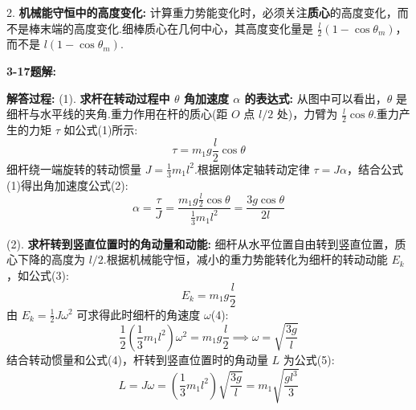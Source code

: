 2. \textbf{机械能守恒中的高度变化:} 计算重力势能变化时，必须关注\textbf{质心}的高度变化，而不是棒末端的高度变化.细棒质心在几何中心，其高度变化量是 $\frac{l}{2}(1-\cos\theta_m)$，而不是 $l(1-\cos\theta_m)$.

\vspace{2em}

\textbf{3-17题解:}


\textbf{解答过程:}
(1). \textbf{求杆在转动过程中 $\theta$ 角加速度 $\alpha$ 的表达式:}
从图中可以看出，$\theta$ 是细杆与水平线的夹角.重力作用在杆的质心(距 $O$ 点 $l/2$ 处)，力臂为 $\frac{l}{2}\cos\theta$.重力产生的力矩 $\tau$ 如公式(1)所示:
\begin{equation}
	\tau = m_1 g \frac{l}{2} \cos\theta
\end{equation}
细杆绕一端旋转的转动惯量 $J = \frac{1}{3}m_1 l^2$.根据刚体定轴转动定律 $\tau = J\alpha$，结合公式(1)得出角加速度公式(2):
\begin{equation}
	\alpha = \frac{\tau}{J} = \frac{m_1 g \frac{l}{2} \cos\theta}{\frac{1}{3}m_1 l^2} = \frac{3g \cos\theta}{2l}
\end{equation}

(2). \textbf{求杆转到竖直位置时的角动量和动能:}
细杆从水平位置自由转到竖直位置，质心下降的高度为 $l/2$.根据机械能守恒，减小的重力势能转化为细杆的转动动能 $E_k$，如公式(3):
\begin{equation}
	E_k = m_1 g \frac{l}{2}
\end{equation}
由 $E_k = \frac{1}{2}J\omega^2$ 可求得此时细杆的角速度 $\omega$(4):
\begin{equation}
	\frac{1}{2}\left(\frac{1}{3}m_1 l^2\right)\omega^2 = m_1 g \frac{l}{2} \implies \omega = \sqrt{\frac{3g}{l}}
\end{equation}
结合转动惯量和公式(4)，杆转到竖直位置时的角动量 $L$ 为公式(5):
\begin{equation}
	L = J\omega = \left(\frac{1}{3}m_1 l^2\right)\sqrt{\frac{3g}{l}} = m_1 \sqrt{\frac{g l^3}{3}}
\end{equation}

